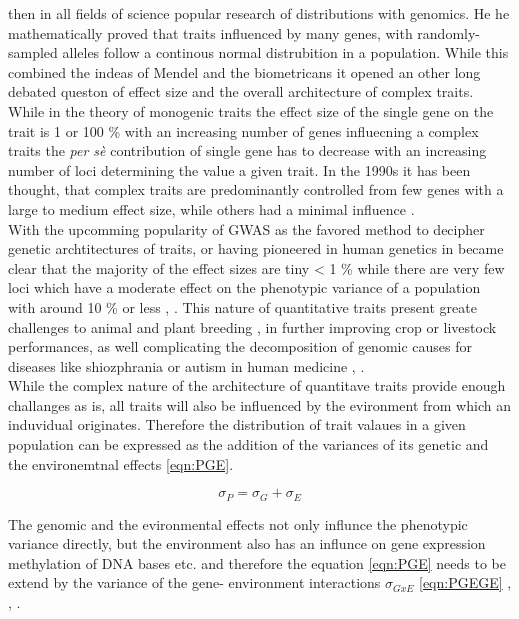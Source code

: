 then in all fields of science popular research of distributions with genomics. He he mathematically proved that traits influenced by many
genes, with randomly-sampled alleles follow a continous normal distrubition in a population. While this combined the indeas of Mendel and the
biometricans it opened an other long debated queston of effect size and the overall architecture of complex traits. While in the theory of
monogenic traits the effect size of the single gene on the trait is 1 or 100 \% with an increasing number of genes influecning a complex
traits the \textit{per sè} contribution of single gene has to decrease with an increasing number of loci determining the value a given
trait. In the 1990s it has been thought, that complex traits are predominantly controlled from few genes with a large to medium effect size,
while others had a minimal influence \cite{zhang2018esti}. \\
With the upcomming popularity of GWAS as the favored method to decipher genetic archtitectures of traits, or having pioneered in human
genetics in became clear that the majority of the effect sizes are tiny < 1 \% while there are very few loci which have a moderate
effect on the phenotypic variance of a population with around 10 \% or less \cite{korte2013advantages}, \cite{stringer2011}.
This nature of quantitative traits present greate challenges to animal \cite{goddard2009} and plant breeding \cite{wurschum2012},
in further improving crop or livestock performances, as well complicating the decomposition of genomic causes for diseases like shiozphrania
or autism in human medicine \cite{de2014}, \cite{purcell2014}. \\
While the complex nature of the architecture of quantitave traits provide enough challanges as is, all traits will also be influenced
by the evironment from which an induvidual originates.
Therefore the distribution of trait valaues in a given population can be expressed as the addition of the variances of its genetic and the
environemtnal effects \ref{eqn:PGE}.

\begin{equation}
  \sigma_{P} = \sigma_{G} + \sigma_{E}
  \label{eqn:PGE}
\end{equation}

The genomic and the evironmental effects not only influnce the phenotypic variance directly, but the environment also has an influnce
on gene expression methylation of DNA bases etc. and therefore the equation \ref{eqn:PGE} needs to be extend by the variance of the gene-
environment interactions $\sigma_{GxE}$  \ref{eqn:PGEGE} , \cite{lynch1998}, \cite{walsh2018}.
                                                               
